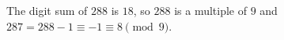 The digit sum of $288$ is $18$, so $288$ is a multiple of $9$ and $287=288-1\equiv-1\equiv\boxed{8}\pmod9$.
